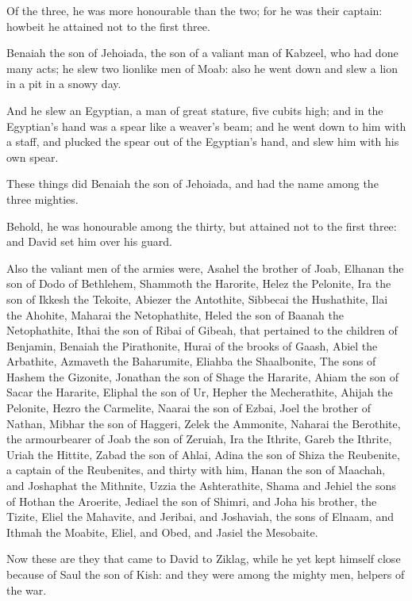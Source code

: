 \Verse Of the three, he was more honourable than the two; for he was their captain: howbeit he attained not to the first three.

\Verse Benaiah the son of Jehoiada, the son of a valiant man of Kabzeel, who had done many acts; he slew two lionlike men of Moab: also he went down and slew a lion in a pit in a snowy day.

\Verse And he slew an Egyptian, a man of great stature, five cubits high; and in the Egyptian's hand was a spear like a weaver's beam; and he went down to him with a staff, and plucked the spear out of the Egyptian's hand, and slew him with his own spear.

\Verse These things did Benaiah the son of Jehoiada, and had the name among the three mighties.

\Verse Behold, he was honourable among the thirty, but attained not to the first three: and David set him over his guard.

\Verse Also the valiant men of the armies were, Asahel the brother of Joab, Elhanan the son of Dodo of Bethlehem, \Verse Shammoth the Harorite, Helez the Pelonite, \Verse Ira the son of Ikkesh the Tekoite, Abiezer the Antothite, \Verse Sibbecai the Hushathite, Ilai the Ahohite, \Verse Maharai the Netophathite, Heled the son of Baanah the Netophathite, \Verse Ithai the son of Ribai of Gibeah, that pertained to the children of Benjamin, Benaiah the Pirathonite, \Verse Hurai of the brooks of Gaash, Abiel the Arbathite, \Verse Azmaveth the Baharumite, Eliahba the Shaalbonite, \Verse The sons of Hashem the Gizonite, Jonathan the son of Shage the Hararite, \Verse Ahiam the son of Sacar the Hararite, Eliphal the son of Ur, \Verse Hepher the Mecherathite, Ahijah the Pelonite, \Verse Hezro the Carmelite, Naarai the son of Ezbai, \Verse Joel the brother of Nathan, Mibhar the son of Haggeri, \Verse Zelek the Ammonite, Naharai the Berothite, the armourbearer of Joab the son of Zeruiah, \Verse Ira the Ithrite, Gareb the Ithrite, \Verse Uriah the Hittite, Zabad the son of Ahlai, \Verse Adina the son of Shiza the Reubenite, a captain of the Reubenites, and thirty with him, \Verse Hanan the son of Maachah, and Joshaphat the Mithnite, \Verse Uzzia the Ashterathite, Shama and Jehiel the sons of Hothan the Aroerite, \Verse Jediael the son of Shimri, and Joha his brother, the Tizite, \Verse Eliel the Mahavite, and Jeribai, and Joshaviah, the sons of Elnaam, and Ithmah the Moabite, \Verse Eliel, and Obed, and Jasiel the Mesobaite.


\Chapter
\Verse Now these are they that came to David to Ziklag, while he yet kept himself close because of Saul the son of Kish: and they were among the mighty men, helpers of the war.

